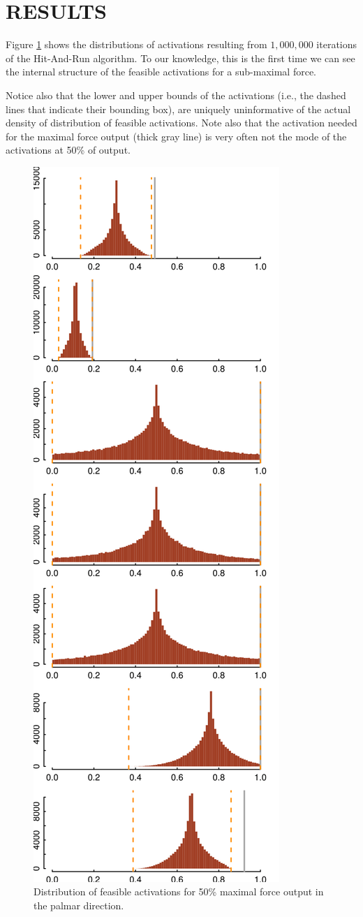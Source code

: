 \section{RESULTS}

Figure \ref{fig:raw_histograms} shows the distributions of activations resulting from $1,000,000$ iterations of the Hit-And-Run algorithm. To our knowledge, this is the first time we can see the internal structure of the feasible activations for a sub-maximal force.

Notice also that the lower and upper bounds of the activations (i.e., the dashed lines that indicate their bounding box), are uniquely uninformative of the actual density of distribution of feasible activations. Note also that the activation needed for the maximal force output (thick gray line) is very often not the mode of the activations at 50\% of output.

\begin{figure}[htbp]
\centering
\includegraphics[width=7.5cm\textwidth]{sections/figs/raw_histograms.png}
\caption{Distribution of feasible activations for 50\% maximal force output in the palmar direction.}
\label{fig:raw_histograms}
\end{figure}
